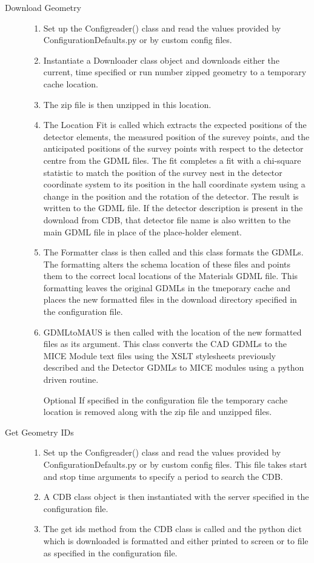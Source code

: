 \begin{description}
  \item[Download Geometry] \hfill
  \begin{enumerate}
   \item Set up the Configreader() class and read the values provided by ConfigurationDefaults.py or by custom config files.
   \item Instantiate a Downloader class object and downloads either the current, time specified or run number zipped geometry to a temporary cache
location.
   \item The zip file is then unzipped in this location.
   \item The Location Fit is called which extracts the expected
   positions of the detector elements, the measured position of the
   surevey points, and the anticipated positions of the survey points
   with respect to the detector centre from the GDML files. The fit
   completes a fit with a chi-square statistic to match the position
   of the survey nest in the detector coordinate system to its
   position in the hall coordinate system using a change in the
   position and the rotation of the detector. The result is written to
   the GDML file. If the detector description is present in the
   download from CDB, that detector file name is also written to the
   main GDML file in place of the place-holder element.
   \item The Formatter class is then called and this class formats the
GDMLs. The formatting alters the schema location of these files and
points them to the correct local locations of the Materials GDML
file. This formatting leaves the original GDMLs in the tmeporary cache
and places the new formatted files in the download directory specified
in the configuration file.
   \item GDMLtoMAUS is then called with the location of the new
formatted files as its argument. This class converts the CAD GDMLs to
the MICE Module text files using the XSLT stylesheets previously
described and the Detector GDMLs to MICE modules using a python driven
routine.
   \item[Optional] If specified in the configuration file the
   temporary cache location is removed along with the zip file and
   unzipped files.
  \end{enumerate}

  \item[Get Geometry IDs]
  \begin{enumerate}
   \item Set up the Configreader() class and read the values provided
by ConfigurationDefaults.py or by custom config files. This file takes
start and stop time arguments to specify a period to search the CDB.
   \item A CDB class object is then instantiated with the server
   specified in the configuration file.
   \item The get ids method from the CDB class is called and the
python dict which is downloaded is formatted and either printed to
screen or to file as specified in the configuration file.
  \end{enumerate}
\end{description}

